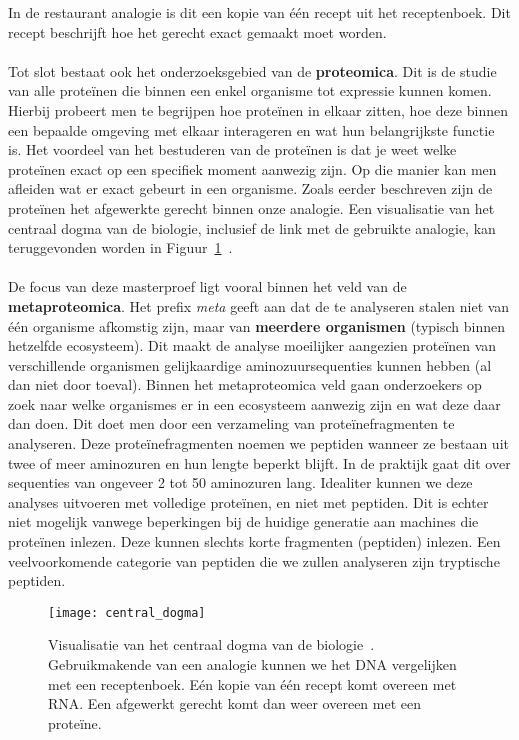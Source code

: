 In de restaurant analogie is dit een kopie van één recept uit het receptenboek.
Dit recept beschrijft hoe het gerecht exact gemaakt moet worden.
\\ \\
Tot slot bestaat ook het onderzoeksgebied van de \textbf{proteomica}.
Dit is de studie van alle proteïnen die binnen een enkel organisme tot expressie kunnen komen.
Hierbij probeert men te begrijpen hoe proteïnen in elkaar zitten, hoe deze binnen een bepaalde omgeving met elkaar interageren en wat hun belangrijkste functie is.
Het voordeel van het bestuderen van de proteïnen is dat je weet welke proteïnen exact op een specifiek moment aanwezig zijn.
Op die manier kan men afleiden wat er exact gebeurt in een organisme.
Zoals eerder beschreven zijn de proteïnen het afgewerkte gerecht binnen onze analogie.
Een visualisatie van het centraal dogma van de biologie, inclusief de link met de gebruikte analogie, kan teruggevonden worden in Figuur~\ref{fig:recipe}~\cite{image_central_dogma}.
\\ \\
De focus van deze masterproef ligt vooral binnen het veld van de \textbf{metaproteomica}.
Het prefix \textit{meta} geeft aan dat de te analyseren stalen niet van één organisme afkomstig zijn, maar van \textbf{meerdere organismen} (typisch binnen hetzelfde ecosysteem).
Dit maakt de analyse moeilijker aangezien proteïnen van verschillende organismen gelijkaardige aminozuursequenties kunnen hebben (al dan niet door toeval).
Binnen het metaproteomica veld gaan onderzoekers op zoek naar welke organismes er in een ecosysteem aanwezig zijn en wat deze daar dan doen.
Dit doet men door een verzameling van proteïnefragmenten te analyseren.
Deze proteïnefragmenten noemen we peptiden wanneer ze bestaan uit twee of meer aminozuren en hun lengte beperkt blijft.
In de praktijk gaat dit over sequenties van ongeveer 2 tot 50 aminozuren lang.
Idealiter kunnen we deze analyses uitvoeren met volledige proteïnen, en niet met peptiden.
Dit is echter niet mogelijk vanwege beperkingen bij de huidige generatie aan machines die proteïnen inlezen.
Deze kunnen slechts korte fragmenten (peptiden) inlezen.
Een veelvoorkomende categorie van peptiden die we zullen analyseren zijn tryptische peptiden.

\begin{figure}[H]
    \centering
    \texttt{[image: central\_dogma]}
    \caption{Visualisatie van het centraal dogma van de biologie~\cite{image_central_dogma}. Gebruikmakende van een analogie kunnen we het DNA vergelijken met een receptenboek. Eén kopie van één recept komt overeen met RNA. Een afgewerkt gerecht komt dan weer overeen met een proteïne.}
    \label{fig:recipe}
\end{figure}


